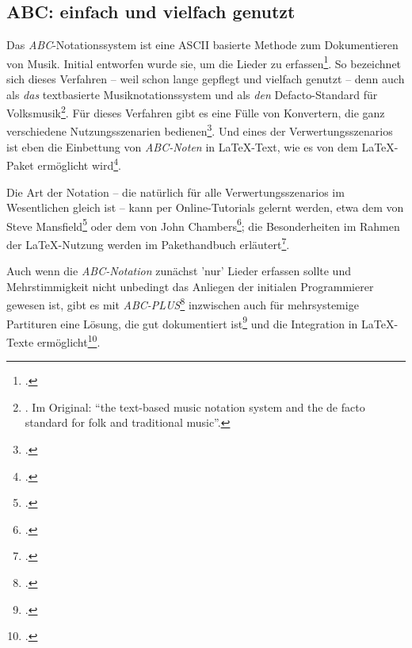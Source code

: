 %
%
%




\subsection{ABC: einfach und vielfach genutzt}

Das \textit{ABC}-Notationssystem ist eine ASCII basierte Methode zum Dokumentieren
von Musik. Initial entworfen wurde sie, um die Lieder zu
erfassen\footcite[vgl.][\nopage Subpage 'Intro']{Chambers2018a}. So bezeichnet
sich dieses Verfahren -- weil schon lange gepflegt und vielfach genutzt -- denn
auch als \textit{das} textbasierte Musiknotationssystem und als \textit{den}
Defacto-Standard für Volksmusik\footnote{\cite[vgl.][\nopage wp]{Abc2018a}. Im
Original: \enquote{the text-based music notation system and the de facto
standard for folk and traditional music}.}. Für dieses Verfahren gibt es eine
Fülle von Konvertern, die ganz verschiedene Nutzungsszenarien
bedienen\footcite[vgl.][\nopage wp]{Abc2018b}. Und eines der
Verwertungsszenarios ist eben die Einbettung von \textit{ABC-Noten} in
\LaTeX-Text, wie es von dem \LaTeX-Paket ermöglicht
wird\footcite[vgl.][\nopage wp]{CtanAbc2018a}.

Die Art der Notation -- die natürlich für alle Verwertungsszenarios im
Wesentlichen gleich ist -- kann per Online-Tutorials gelernt werden, etwa dem
von Steve Mansfield\footcite[vgl.][\nopage wp]{Mansfield2016a} oder dem von
John Chambers\footcite[vgl.][\nopage wp]{Chambers2018a}; die Besonderheiten im
Rahmen der \LaTeX-Nutzung werden im Pakethandbuch
erläutert\footcite[vgl.][\nopage wp]{Gregorio2016a}.

Auch wenn die \textit{ABC-Notation} zunächst 'nur' Lieder erfassen sollte und
Mehrstimmigkeit nicht unbedingt das Anliegen der initialen Programmierer gewesen
ist, gibt es mit \textit{ABC-PLUS}\footcite[vgl.][\nopage wp]{Gonzato2018a}
inzwischen auch für mehrsystemige Partituren eine Lösung, die gut dokumentiert
ist\footcite[vgl.][XVff]{Gonzato2018b} und die Integration in
\LaTeX-Texte ermöglicht\footcite[vgl.][134]{Gonzato2018b}.

